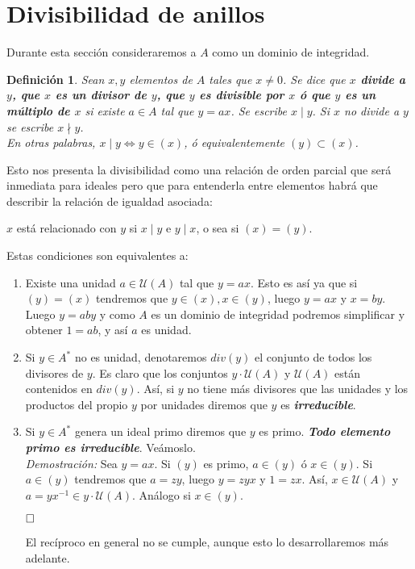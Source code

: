 \documentclass[12pt]{article}
\newtheorem{definition}[theorem]{Definición}
\begin{document}
\section{Divisibilidad de anillos}

Durante esta sección consideraremos a $A$ como un dominio de integridad.

\begin{definition} Sean $x, y$ elementos de $A$ tales que $x \neq 0$. Se dice que \textbf{$x$ divide a $y$, que $x$ es un divisor de $y$, que $y$ es divisible por $x$ ó que $y$ es un múltiplo de $x$} si existe $a \in A$ tal que $y = ax$. Se escribe $x \mid y$. Si $x$ no divide a $y$ se escribe $x \nmid y$.\vspace{0.2cm}\\
En otras palabras, $x \mid y \Leftrightarrow y \in (x)$, ó equivalentemente $(y) \subset (x)$.
\end{definition}

Esto nos presenta la divisibilidad como una relación de orden parcial que será inmediata para ideales pero que para entenderla entre elementos habrá que describir la relación de igualdad asociada: 
\begin{center}
$x$ está relacionado con $y$ si $x \mid y$ e $y \mid x$, o sea si $(x) = (y).$
\end{center} 
Estas condiciones son equivalentes a: \begin{enumerate}
\item Existe una unidad $a \in \mathcal{U}(A)$ tal que $y = ax$. Esto es así ya que si $(y) = (x)$ tendremos que $y \in (x), x \in (y)$, luego $y = ax$ y $x = by$. Luego $y = aby$ y como $A$ es un dominio de integridad podremos simplificar y obtener $1 = ab$, y así $a$ es unidad.
\item Si $y \in A^{\ast}$ no es unidad, denotaremos $div(y)$ el conjunto de todos los divisores de $y$. Es claro que los conjuntos $y \cdot \mathcal{U}(A)$ y $\mathcal{U}(A)$ están contenidos en $div(y)$. Así, si $y$ no tiene más divisores que las unidades y los productos del propio $y$ por unidades diremos que $y$ es \textbf{\textit{irreducible}}.
\item Si $y \in A^{\ast}$ genera un ideal primo diremos que $y$ es primo. \textbf{\textit{Todo elemento primo es irreducible}}. Veámoslo. \vspace{0.2cm}\\
\emph{Demostración: } Sea $y = ax$. Si $(y)$ es primo, $a \in (y)$ ó $x \in (y)$. Si $a \in (y)$ tendremos que $a = zy$, luego $y = zyx$ y $1 = zx$. Así, $x \in \mathcal{U}(A)$ y $a = yx^{-1} \in y \cdot \mathcal{U}(A)$. Análogo si $x \in (y)$.

$\hfill \square$

El recíproco en general no se cumple, aunque esto lo desarrollaremos más adelante.
\end{enumerate} 
\end{document}
